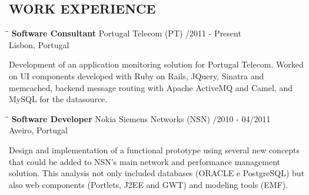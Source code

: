 \documentclass{res}
\begin{document}
                               				         
\address{\bf  PRESENT ADDRESS\\Places and stuff\\cities and the like\\(351) 55
555 555} \address{\bf PERMANENT ADDRESS\\Home town\\ home city\\  (351) 55 555
5555}
                               				               


\begin{resume}

\section{WORK EXPERIENCE}

\vspace{-0.1in}
\begin{tabbing}
\hspace{2.3in}\= \hspace{2.6in}\= \kill %
{\bf Software Consultant} \>Portugal Telecom (PT)     /2011 - Present\\
\>Lisbon, Portugal
\end{tabbing}\vspace{-20pt}      %
Development of an application monitoring solution for Portugal Telecom.
Worked on UI components developed with Ruby on Rails, JQuery, Sinatra and memcached, backend message routing with Apache ActiveMQ and Camel, and MySQL for the datasource.

\begin{tabbing}
\hspace{2.3in}\= \hspace{2.6in}\= \kill %
{\bf Software Developer} \>Nokia Siemens Networks (NSN)    
/2010 - 04/2011\\ \>Aveiro, Portugal
\end{tabbing}\vspace{-20pt}      %
Design and implementation of a functional prototype using several new concepts that could be added to NSN's main network and performance management solution.
This analysis not only included databases (ORACLE e PostgreSQL) but also web components (Portlets, J2EE and GWT) and modeling tools (EMF).


\end{resume}
\end{document}
